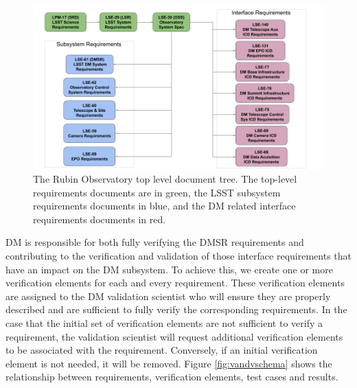\begin{figure}
\begin{center}
\includegraphics[width=\textwidth]{imgs/TopLevelDocTree.png}
 \caption{The Rubin Observatory top level document tree. The top-level requirements documents are in green, 
 the LSST subsystem requirements documents in blue, and the DM related interface requirements documents in red. }
 \label{fig:topdoctree}
\end{center}
\end{figure}

DM is responsible for both fully verifying the DMSR requirements and contributing to the verification and validation of those interface requirements that have an impact on the DM subsystem.
To achieve this, we create one or more verification elements for each and every requirement. 
These verification elements are assigned to the DM validation scientist who will ensure they are properly described and are sufficient to fully verify the corresponding requirements.
In the case that the initial set of verification elements are not sufficient to verify a requirement, the validation scientist will request additional verification elements to be associated with the requirement.
Conversely, if an initial verification element is not needed, it will be removed.
Figure \ref{fig:vandvschema} shows the relationship between requirements, verification elements, test cases and results.

